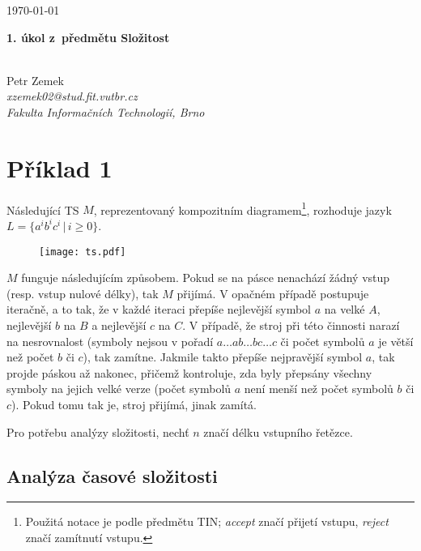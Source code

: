 \documentclass[10pt,a4paper]{article}
\newcommand{\st}[0]{\,|\,} %
\begin{document}
\begin{flushright}
	\today
\end{flushright}

\begin{center}
	\begin{large}\textbf{1. úkol z~předmětu Složitost}\end{large} \\
	\vspace{0.4cm}
	Petr Zemek \\
	\textit{xzemek02@stud.fit.vutbr.cz} \\
	\textit{Fakulta Informačních Technologií, Brno} \\
\end{center}

\section*{Příklad 1}

Následující TS $M$, reprezentovaný kompozitním diagramem\footnote{Použitá notace je podle předmětu TIN; \emph{accept} značí přijetí vstupu, \emph{reject} značí zamítnutí vstupu.}, rozhoduje jazyk $L = \{a^{i}b^{i}c^{i} \st i \geq 0\}$.

\vfill

\begin{figure}[h!]
	\begin{center}
		\texttt{[image: ts.pdf]}
	\end{center}
\end{figure}

\vfill

$M$ funguje následujícím způsobem. Pokud se na pásce nenachází žádný vstup (resp. vstup nulové délky), tak $M$ přijímá. V opačném případě postupuje iteračně, a to tak, že v každé iteraci přepíše nejlevější symbol $a$ na velké $A$, nejlevější $b$ na $B$ a nejlevější $c$ na $C$. V případě, že stroj při této činnosti narazí na nesrovnalost (symboly nejsou v pořadí $a\dots ab\dots bc\dots c$ či počet symbolů $a$ je větší než počet $b$ či $c$), tak zamítne. Jakmile takto přepíše nejpravější symbol $a$, tak projde páskou až nakonec, přičemž kontroluje, zda byly přepsány všechny symboly na jejich velké verze (počet symbolů $a$ není menší než počet symbolů $b$ či $c$). Pokud tomu tak je, stroj přijímá, jinak zamítá.

Pro potřebu analýzy složitosti, nechť $n$ značí délku vstupního řetězce.

\subsection*{Analýza časové složitosti}
\end{document}
